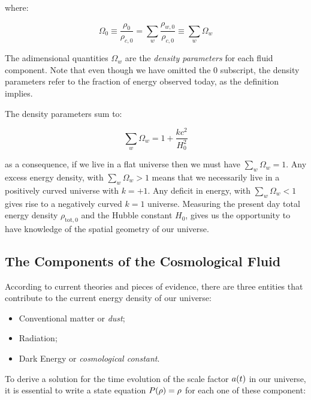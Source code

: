 where:

\begin{equation}
        \Omega_0 \equiv \frac{\rho_0}{\rho_{c,0}} = \sum_w
        \frac{\rho_{w,0}}{\rho_{c,0}} \equiv \sum_w \Omega_w
\end{equation}

The adimensional quantities $\Omega_w$ are the \emph{density parameters}
for each fluid component. Note that even though we have omitted the $0$
subscript, the density parameters refer to the fraction of energy observed
today, as the definition implies.

The density parameters sum to:

\begin{equation}
        \sum_w \Omega_w = 1 + \frac{kc^2}{H^2_0} 
\end{equation}

as a consequence, if we live in a flat universe then we must have $\sum_w
\Omega_w = 1$. Any excess energy density, with $\sum_w \Omega_w > 1$ means
that we necessarily live in a positively curved universe with $k = +1$. Any
deficit in energy, with $\sum_w \Omega_w < 1$ gives rise to a negatively
curved $k = 1$ universe. Measuring the present day total energy density 
$\rho_{\text{tot},0}$ and the Hubble constant $H_0$, gives us the
opportunity to have knowledge of the spatial geometry of our universe. 

\subsection{The Components of the Cosmological Fluid}

According to current theories and pieces of evidence, there are three
entities that contribute to the current energy density of our universe:

\begin{itemize}
        \item Conventional matter or \emph{dust};
        \item Radiation;
        \item Dark Energy or \emph{cosmological constant}.
\end{itemize}

To derive a solution for the time evolution of the scale factor $a\qty(t)$
in our universe, it is essential to write a state equation
$P\qty(\rho) = \rho$ for each one of these component:

